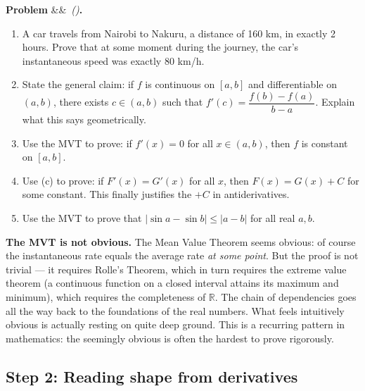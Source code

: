 \documentclass[12pt, a4paper]{article}
\newcounter{problem}
\newenvironment{problem}[1][]{%
  \refstepcounter{problem}%
  \par\vspace{6pt}%
  \noindent\textbf{\color{MidBlue}Problem \theproblem}%
  \ifx&#1&\else\ \textit{(#1)}\fi\textbf{.}\enskip
}{\par\vspace{4pt}}
\begin{document}
\begin{problem}
\label{prob:mvt}
\begin{enumerate}[label=(\alph*), topsep=2pt]
  \item A car travels from Nairobi to Nakuru, a distance of 160 km, in exactly 2 hours. Prove that at some moment during the journey, the car's instantaneous speed was exactly 80 km/h.
  \item State the general claim: if $f$ is continuous on $[a,b]$ and differentiable on $(a,b)$, there exists $c \in (a,b)$ such that $f'(c) = \dfrac{f(b)-f(a)}{b-a}$. Explain what this says geometrically.
  \item Use the MVT to prove: if $f'(x) = 0$ for all $x \in (a,b)$, then $f$ is constant on $[a,b]$.
  \item Use (c) to prove: if $F'(x) = G'(x)$ for all $x$, then $F(x) = G(x) + C$ for some constant. This finally justifies the $+C$ in antiderivatives.
  \item Use the MVT to prove that $|\sin a - \sin b| \leq |a - b|$ for all real $a, b$.
\end{enumerate}
\end{problem}

\begin{thought}
\textbf{The MVT is not obvious.}
The Mean Value Theorem seems obvious: of course the instantaneous rate equals the average rate \emph{at some point}. But the proof is not trivial --- it requires Rolle's Theorem, which in turn requires the extreme value theorem (a continuous function on a closed interval attains its maximum and minimum), which requires the completeness of $\mathbb{R}$. The chain of dependencies goes all the way back to the foundations of the real numbers. What feels intuitively obvious is actually resting on quite deep ground. This is a recurring pattern in mathematics: the seemingly obvious is often the hardest to prove rigorously.
\end{thought}

\subsection{Step 2: Reading shape from derivatives}
\end{document}
